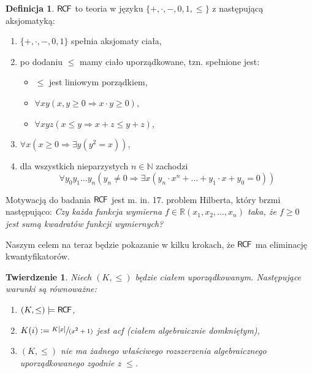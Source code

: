 \documentclass{article}
\newcommand{\N}{\mathbb{N}}
\newcommand{\R}{\mathbb{R}}
\theoremstyle{plain}
\newtheorem{tw}[thm]{Twierdzenie}
\theoremstyle{definition}
\newtheorem{df}[thm]{Definicja}
\theoremstyle{remark}
\newcommand{\RCF}{\mathsf{R \mkern-1.7mu C \mkern-1.4mu F}}
\begin{document}
\begin{df}
	 $ \RCF $ to teoria w języku $ \{ +, \cdot, -, 0, 1, \leq \} $ z następującą aksjomatyką:
	 \begin{enumerate}
		 \item $ \{+, \cdot, -, 0, 1\} $ spełnia aksjomaty ciała,
		 \item po dodaniu $\leq $ mamy ciało uporządkowane, tzn. spełnione jest:
			 \begin{itemize}
				 \item $ \leq $ jest liniowym porządkiem,
				 \item $ \forall x y (x, y \geq 0 \Rightarrow x\cdot y \geq 0) $,
				 \item $\forall x y z (x \leq y \Rightarrow x + z \leq y + z )  $,
			 \end{itemize}

		 \item $ \forall x (x \geq 0 \Rightarrow \exists y ( y^2 = x )) $,
		 \item dla wszystkich nieparzystych $ n \in \N$ zachodzi
			 \[
				 \forall y_0 y_1 \ldots y_n (y_n \neq 0 \Rightarrow \exists x (y_n \cdot x^n + \ldots + y_1 \cdot x + y_0 = 0))
		         \]
	 \end{enumerate}

\end{df}

Motywacją do badania $ \RCF $ jest m. in. 17. problem Hilberta, który brzmi następująco:
\textit{Czy każda funkcja wymierna $ f \in \R(x_1, x_2, \ldots, x_n ) $ taka, że $ f \geq 0 $ jest sumą kwadratów funkcji wymiernych?}

Naszym celem na teraz będzie pokazanie w kilku krokach, że $ \RCF $ ma eliminację kwantyfikatorów.

\begin{tw}
\label{tw:rcf}
	 Niech $ (K, \leq) $ będzie ciałem uporządkowanym.
	 Następujące warunki są równoważne:
	 \begin{enumerate}
		 \item $(K, \leq) \models \RCF $,
		 \item $K(i) := \sfrac{K[x]}{(x^2 + 1)} $ jest acf (ciałem
			 algebraicznie domkniętym),
		 \item $ (K, \leq) $ nie ma żadnego właściwego rozszerzenia
			 algebraicznego uporządkowanego zgodnie z $ \leq $.
	 \end{enumerate}
\end{tw}
\end{document}
